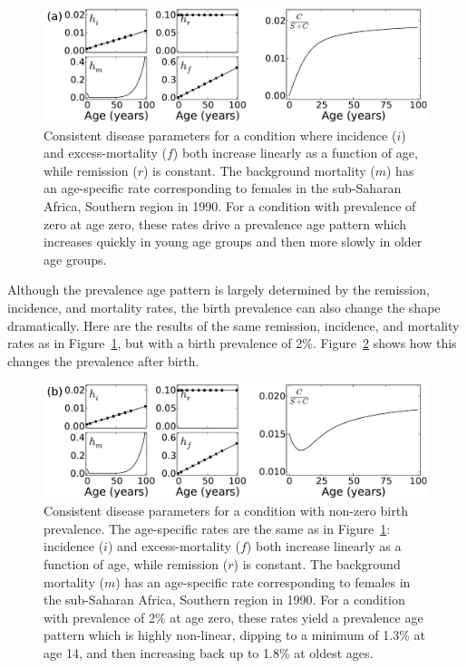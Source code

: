 \begin{figure}[h]
\begin{center}
\includegraphics[width=\textwidth]{more-excess-mortality.pdf}

\caption{Consistent disease parameters for a condition where incidence
  ($i$) and excess-mortality ($f$) both increase linearly as a
  function of age, while remission ($r$) is constant. The background
  mortality ($m$) has an age-specific rate corresponding to females in
  the sub-Saharan Africa, Southern region in 1990. For a condition
  with prevalence of zero at age zero, these rates drive a prevalence
  age pattern which increases quickly in young age groups and then
  more slowly in older age groups.}
\label{forward-sim-more-excess-mortality}
\end{center}
\end{figure}


Although the prevalence age pattern is largely determined by the
remission, incidence, and mortality rates, the birth prevalence can
also change the shape dramatically.  Here are the results of the same
remission, incidence, and mortality rates as in
Figure~\ref{forward-sim-more-excess-mortality}, but with a birth
prevalence of 2\%.  Figure~\ref{forward-sim-birth-prevalence} shows
how this changes the prevalence after birth.

\begin{figure}[h]
\begin{center}

\includegraphics[width=\textwidth]{birth-prevalence.pdf}

\caption{Consistent disease parameters for a condition with non-zero
  birth prevalence.  The age-specific rates are the same as in
  Figure~\ref{forward-sim-more-excess-mortality}: incidence ($i$) and
  excess-mortality ($f$) both increase linearly as a function of age,
  while remission ($r$) is constant. The background mortality ($m$)
  has an age-specific rate corresponding to females in the sub-Saharan
  Africa, Southern region in 1990. For a condition with prevalence of
  2\% at age zero, these rates yield a prevalence age pattern which is
  highly non-linear, dipping to a minimum of 1.3\% at age 14, and then
  increasing back up to 1.8\% at oldest ages.}
\label{forward-sim-birth-prevalence}
\end{center}
\end{figure}


